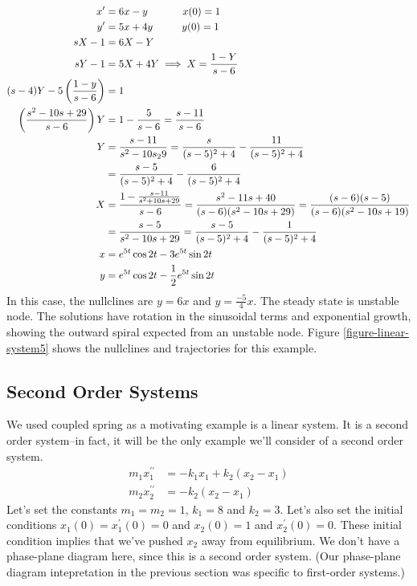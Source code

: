 \documentclass[fleqn,letterpaper]{report}
\begin{document}
\begin{example}
\begin{align*}
x^\prime & = 6x - y \hspace{1.2cm} x(0) = 1 \\
y^\prime & = 5x + 4y \hspace{1cm} y(0) = 1\\
sX - 1 & = 6X - Y \\
sY - 1 & = 5X + 4Y \implies X = \frac{1-Y}{s-6} \\
(s-4)Y - 5 \left( \frac{1-y}{s-6} \right) & = 1 \\
\left( \frac{s^2-10s+29}{s-6} \right) Y & = 1 - \frac{5}{s-6}
= \frac{s-11}{s-6}\\
Y & = \frac{s-11}{s^2-10s_29} = \frac{s}{(s-5)^2+4} -
\frac{11}{(s-5)^2 + 4} \\
& = \frac{s-5}{(s-5)^2+4} - \frac{6}{(s-5)^2 + 4} \\
X & = \frac{1 - \frac{s-11}{s^2+10s+29}}{s-6} = 
\frac{s^2-11s + 40}{(s-6)(s^2-10s+29)} =
\frac{(s-6)(s-5)}{(s-6)(s^2-10s+19)} \\
& = \frac{s-5}{s^2-10s+29} = \frac{s-5}{(s-5)^2 +4} -
\frac{1}{(s-5)^2 + 4} \\
x & = e^{5t} \cos 2t - 3 e^{5t} \sin 2t\\
y & = e^{5t} \cos 2t - \frac{1}{2} e^{5t} \sin 2t
\end{align*}
In this case, the nullclines are $y = 6x$ and $y =
\frac{-5}{4}x$.  The steady state is unstable node. The
solutions have rotation in the sinusoidal terms and
exponential growth, showing the outward spiral expected from
an unstable node. Figure \ref{figure-linear-system5}
shows the nullclines and trajectories for this example.
\end{example}

\subsection{Second Order Systems}
\label{second-order-systems}

We used coupled spring as a motivating example is a linear
system. It is a second order system--in fact, it will be the
only example we'll consider of a second order system.
\begin{align*}
m_1x_1^{\prime \prime} & = - k_1x_1 + k_2(x_2 - x_1) \\
m_2x_2^{\prime \prime} & = -k_2(x_2-x_1) 
\end{align*}
Let's set the constants $m_1 = m_2 =1$, $k_1=8$ and $k_2=3$.
Let's also set the initial conditions $x_1(0) = x_1^\prime(0)
= 0$ and $x_2(0) = 1$ and $x_2^\prime(0) = 0$. These initial
condition implies that we've pushed $x_2$ away from
equilibrium. We don't have a phase-plane diagram here, since
this is a second order system. (Our phase-plane diagram
intepretation in the previous section was specific to
first-order systems.)
\end{document}
